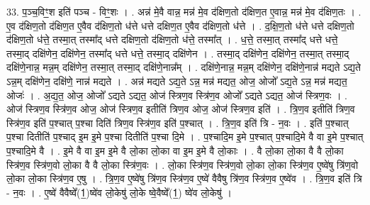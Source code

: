 \documentclass[17pt]{extarticle}
\begin{document}
33. प॒ञ्च॒विꣳ॒॒श इति॑ पञ्च - विꣳ॒॒शः । . अन्न॑ मे॒वै वान्न॒ मन्न॑ मे॒व द॑क्षिण॒तो द॑क्षिण॒त ए॒वान्न॒ मन्न॑ मे॒व द॑क्षिण॒तः । . ए॒व द॑क्षिण॒तो द॑क्षिण॒त ए॒वैव द॑क्षिण॒तो ध॑त्ते धत्ते दक्षिण॒त ए॒वैव द॑क्षिण॒तो ध॑त्ते । . द॒क्षि॒ण॒तो ध॑त्ते धत्ते दक्षिण॒तो द॑क्षिण॒तो ध॑त्ते॒ तस्मा॒त् तस्मा᳚द् धत्ते दक्षिण॒तो द॑क्षिण॒तो ध॑त्ते॒ तस्मा᳚त् । . ध॒त्ते॒ तस्मा॒त् तस्मा᳚द् धत्ते धत्ते॒ तस्मा॒द् दक्षि॑णेन॒ दक्षि॑णेन॒ तस्मा᳚द् धत्ते धत्ते॒ तस्मा॒द् दक्षि॑णेन । . तस्मा॒द् दक्षि॑णेन॒ दक्षि॑णेन॒ तस्मा॒त् तस्मा॒द् दक्षि॑णे॒नान्न॒ मन्न॒म् दक्षि॑णेन॒ तस्मा॒त् तस्मा॒द् दक्षि॑णे॒नान्न᳚म् । . दक्षि॑णे॒नान्न॒ मन्न॒म् दक्षि॑णेन॒ दक्षि॑णे॒नान्न॑ मद्यते ऽद्य॒ते ऽन्न॒म् दक्षि॑णेन॒ दक्षि॑णे॒ नान्न॑ मद्यते । . अन्न॑ मद्यते ऽद्य॒ते ऽन्न॒ मन्न॑ मद्यत॒ ओज॒ ओजो᳚ ऽद्य॒ते ऽन्न॒ मन्न॑ मद्यत॒ ओजः॑ । . अ॒द्य॒त॒ ओज॒ ओजो᳚ ऽद्यते ऽद्यत॒ ओज॑ स्त्रिण॒व स्त्रि॑ण॒व ओजो᳚ ऽद्यते ऽद्यत॒ ओज॑ स्त्रिण॒वः । . ओज॑ स्त्रिण॒व स्त्रि॑ण॒व ओज॒ ओज॑ स्त्रिण॒व इतीति॑ त्रिण॒व ओज॒ ओज॑ स्त्रिण॒व इति॑ । . त्रि॒ण॒व इतीति॑ त्रिण॒व स्त्रि॑ण॒व इति॑ प॒श्चात् प॒श्चा दिति॑ त्रिण॒व स्त्रि॑ण॒व इति॑ प॒श्चात् । . त्रि॒ण॒व इति॑ त्रि - न॒वः । . इति॑ प॒श्चात् प॒श्चा दितीति॑ प॒श्चाद् इ॒म इ॒मे प॒श्चा दितीति॑ प॒श्चा दि॒मे । . प॒श्चादि॒म इ॒मे प॒श्चात् प॒श्चादि॒मे वै वा इ॒मे प॒श्चात् प॒श्चादि॒मे वै । . इ॒मे वै वा इ॒म इ॒मे वै लो॒का लो॒का वा इ॒म इ॒मे वै लो॒काः । . वै लो॒का लो॒का वै वै लो॒का स्त्रि॑ण॒व स्त्रि॑ण॒वो लो॒का वै वै लो॒का स्त्रि॑ण॒वः । . लो॒का स्त्रि॑ण॒व स्त्रि॑ण॒वो लो॒का लो॒का स्त्रि॑ण॒व ए॒ष्वे॑षु त्रि॑ण॒वो लो॒का लो॒का स्त्रि॑ण॒व ए॒षु । . त्रि॒ण॒व ए॒ष्वे॑षु त्रि॑ण॒व स्त्रि॑ण॒व ए॒ष्वे॑ वैवैषु त्रि॑ण॒व स्त्रि॑ण॒व ए॒ष्वे॑व । . त्रि॒ण॒व इति॑ त्रि - न॒वः । . ए॒ष्वे॑ वैवैष्वे᳚(1॒)ष्वे॑व लो॒केषु॑ लो॒के ष्वे॒वैष्वे᳚(1॒) ष्वे॑व लो॒केषु॑ । \newline
\end{document}
